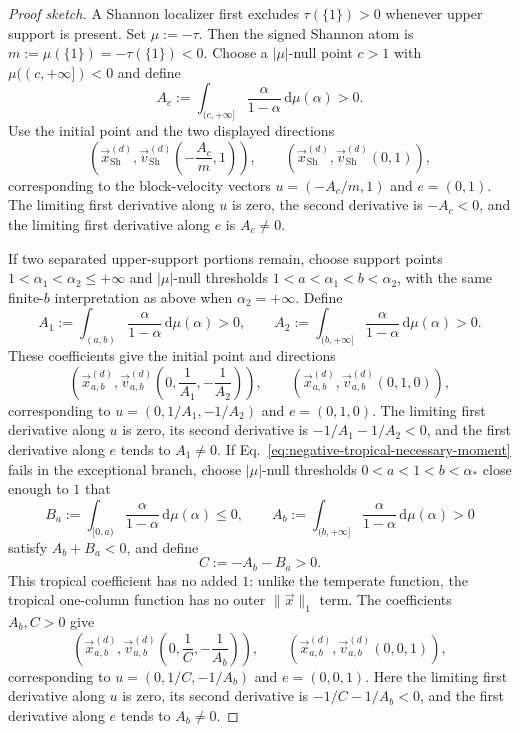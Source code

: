 \documentclass[aps,pra,11pt,onecolumn,nofootinbib,tightenlines]{revtex4-2}
\theoremstyle{definition}
\def\d{\mathrm{d}}
\begin{document}
\begin{proof}[Proof sketch]
A Shannon localizer first excludes $\tau(\{1\})>0$ whenever upper support is
present.  Set $\mu:=-\tau$.  Then the signed Shannon atom is
$m:=\mu(\{1\})=-\tau(\{1\})<0$.  Choose a $|\mu|$-null point $c>1$ with
$\mu((c,+\infty])<0$ and define
\[
A_c:=\int_{(c,+\infty]}
\frac{\alpha}{1-\alpha}\,\d\mu(\alpha)>0.
\]
Use the initial point and the two displayed directions
\begin{equation}
\left(
\vec{x}_{\mathrm{Sh}}^{(d)},
\vec{v}_{\mathrm{Sh}}^{(d)}\!\left(-\frac{A_c}{m},1\right)
\right),
\qquad
\left(
\vec{x}_{\mathrm{Sh}}^{(d)},
\vec{v}_{\mathrm{Sh}}^{(d)}(0,1)
\right),
\label{eq:tropical-Shannon-point-directions}
\end{equation}
corresponding to the block-velocity vectors
$u=(-A_c/m,1)$ and $e=(0,1)$.  The limiting first derivative along $u$ is
zero, the second derivative is $-A_c<0$, and the limiting first derivative
along $e$ is $A_c\neq0$.

If two separated upper-support portions remain, choose support points
$1<\alpha_1<\alpha_2\leq+\infty$ and $|\mu|$-null thresholds
$1<a<\alpha_1<b<\alpha_2$, with the same finite-$b$ interpretation as above
when $\alpha_2=+\infty$.  Define
\[
A_1:=\int_{(a,b)}\frac{\alpha}{1-\alpha}\,\d\mu(\alpha)>0,
\qquad
A_2:=\int_{(b,+\infty]}\frac{\alpha}{1-\alpha}\,\d\mu(\alpha)>0.
\]
These coefficients give the initial point and directions
\begin{equation}
\left(
\vec{x}_{a,b}^{(d)},
\vec{v}_{a,b}^{(d)}\!\left(0,\frac1{A_1},-\frac1{A_2}\right)
\right),
\qquad
\left(
\vec{x}_{a,b}^{(d)},
\vec{v}_{a,b}^{(d)}(0,1,0)
\right),
\label{eq:tropical-two-upper-point-directions}
\end{equation}
corresponding to
$u=(0,1/A_1,-1/A_2)$ and $e=(0,1,0)$.  The limiting first derivative along
$u$ is zero, its second derivative is $-1/A_1-1/A_2<0$, and the first
derivative along $e$ tends to $A_1\neq0$.  If
Eq.~\eqref{eq:negative-tropical-necessary-moment} fails in the exceptional
branch, choose $|\mu|$-null thresholds $0<a<1<b<\alpha_*$ close enough to
$1$ that
\[
B_a:=\int_{[0,a)}\frac{\alpha}{1-\alpha}\,\d\mu(\alpha)\leq0,
\qquad
A_b:=\int_{(b,+\infty]}\frac{\alpha}{1-\alpha}\,\d\mu(\alpha)>0
\]
satisfy $A_b+B_a<0$, and define
\[
C:=-A_b-B_a>0.
\]
This tropical coefficient has no added $1$: unlike the temperate function,
the tropical one-column function has no outer $\|\vec{x}\|_1$ term.  The
coefficients $A_b,C>0$ give
\begin{equation}
\left(
\vec{x}_{a,b}^{(d)},
\vec{v}_{a,b}^{(d)}\!\left(0,\frac1C,-\frac1{A_b}\right)
\right),
\qquad
\left(
\vec{x}_{a,b}^{(d)},
\vec{v}_{a,b}^{(d)}(0,0,1)
\right),
\label{eq:tropical-moment-point-directions}
\end{equation}
corresponding to $u=(0,1/C,-1/A_b)$ and $e=(0,0,1)$.  Here the limiting first
derivative along $u$ is zero, its second derivative is $-1/C-1/A_b<0$, and the
first derivative along $e$ tends to $A_b\neq0$.


\end{proof}
\end{document}
